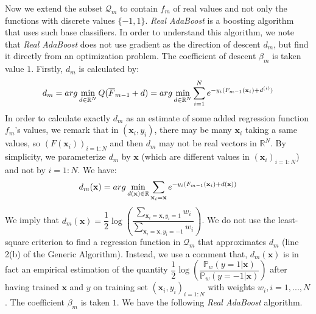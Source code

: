 \documentclass[a4paper,twoside,12pt]{article}
\begin{document}
Now we extend the subset $\mathcal{Q}_m$ to contain $f_m$ of real values and not only the functions with discrete values $\{-1, 1\}$. \textsl{Real AdaBoost} is a boosting algorithm that uses such base classifiers. In order to understand this algorithm, we note that \textsl{Real AdaBoost} does not use gradient as the direction of descent $d_m$, but find it directly from an optimization problem. The coefficient of descent $\beta_m$ is taken value $1$. Firstly, $d_m$ is calculated by:
\begin{align}
    d_m = arg\min\limits_{d\in \mathbb{R}^N} Q(\overline{F}_{m-1} + d) = arg\min\limits_{d\in \mathbb{R}^N} \sum\limits_{i=1}^N e^{-y_i(F_{m-1}(\textbf{x}_i) + d^{(i)})} \notag
\end{align}
In order to calculate exactly $d_m$ as an estimate of some added regression function $f_m$'s values, we remark that in $(\textbf{x}_i, y_i)$, there may be many $\textbf{x}_i$ taking a same values, so $(F(\textbf{x}_i))_{i=1:N}$ and then $d_m$ may not be real vectors in $\mathbb{R}^N$. By simplicity, we parameterize $d_m$ by $\textbf{x}$ (which are different values in $(\textbf{x}_i)_{i=1:N}$) and not by $i = 1:N$. We have:
\begin{align}
    d_m(\textbf{x}) = arg\min\limits_{d(\textbf{x}) \in \mathbb{R}} \sum\limits_{\textbf{x}_i = \textbf{x}} e^{-y_i(F_{m-1}(\textbf{x}_i) + d(\textbf{x}))} \notag
\end{align}
We imply that $d_m(\textbf{x}) = \dfrac{1}{2} \log\left( \dfrac{\sum\limits_{\textbf{x}_i = \textbf{x}, y_i = 1} w_i}{\sum\limits_{\textbf{x}_i = \textbf{x}, y_i = -1} w_i}\right)$. We do not use the least-square criterion to find a regression function in $\mathcal{Q}_m$ that approximates $d_m$ (line 2(b) of the Generic Algorithm). Instead, we use a comment that, $d_m(\textbf{x})$ is in fact an empirical estimation of the quantity $\dfrac{1}{2} \log\left( \dfrac{\mathbb{P}_w(y=1\vert \textbf{x})}{\mathbb{P}_w(y=-1\vert \textbf{x})}\right)$ after having trained $\textbf{x}$ and $y$ on training set $(\textbf{x}_i, y_i)_{i=1:N}$ with weights $w_i, i = 1,...,N$. The coefficient $\beta_m$ is taken $1$. We have the following \textsl{Real AdaBoost} algorithm.

\begin{center}
\end{center}
\end{document}
